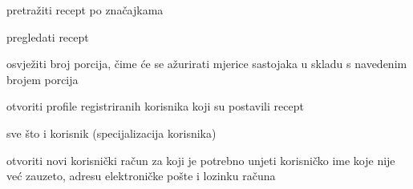 			
			\begin{packed_enum}

				\item  {}
				
				\begin{packed_enum}
					
					\item pretražiti recept po značajkama
					\item pregledati recept
					\item osvježiti broj porcija, čime će se ažurirati mjerice sastojaka u skladu s navedenim brojem porcija
					\item otvoriti profile registriranih korisnika koji su postavili recept
					
				\end{packed_enum}

				\item  {}
				
				\begin{packed_enum}

					\item sve što i korisnik (specijalizacija korisnika)
					\item otvoriti novi korisnički račun za koji je potrebno unjeti korisničko ime koje nije već zauzeto, adresu elektroničke pošte i lozinku računa
					
				\end{packed_enum}

				\item  {}
				
				\begin{packed_enum}
					

\end{packed_enum}
\end{packed_enum}
